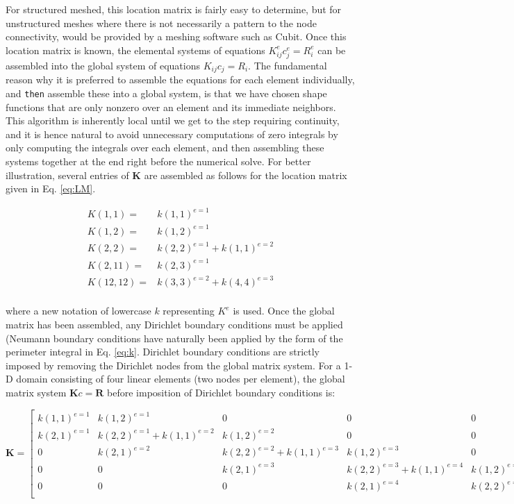 \documentclass[10pt]{article}
\newcommand{\beq}{\begin{equation}}
\newcommand{\eeq}{\end{equation}}
\newcommand{\beqa}{\begin{equation}\begin{aligned}}
\newcommand{\eeqa}{\end{aligned}\end{equation}}
\begin{document}
For structured meshed, this location matrix is fairly easy to determine, but for unstructured meshes where there is not necessarily a pattern to the node connectivity, would be provided by a meshing software such as Cubit. Once this location matrix is known, the elemental systems of equations \(K_{ij}^ec_j^e=R_i^e\) can be assembled into the global system of equations \(K_{ij}c_j=R_i\). The fundamental reason why it is preferred to assemble the equations for each element individually, and {\tt then} assemble these into a global system, is that we have chosen shape functions that are only nonzero over an element and its immediate neighbors. This algorithm is inherently local until we get to the step requiring continuity, and it is hence natural to avoid unnecessary computations of zero integrals by only computing the integrals over each element, and then assembling these systems together at the end right before the numerical solve. For better illustration, several entries of \textbf{K} are assembled as follows for the location matrix given in Eq. \eqref{eq:LM}.

\beqa
K(1, 1) =& k(1, 1)^{e=1}\\
K(1, 2) =& k(1, 2)^{e=1}\\
K(2, 2) =& k(2, 2)^{e=1}+k(1, 1)^{e=2}\\
K(2, 11) =& k(2, 3)^{e=1}\\
K(12, 12) =& k(3, 3)^{e=2}+k(4, 4)^{e=3}\\
\eeqa

where a new notation of lowercase \(k\) representing \(K^e\) is used. Once the global matrix has been assembled, any Dirichlet boundary conditions must be applied (Neumann boundary conditions have naturally been applied by the form of the perimeter integral in Eq. \eqref{eq:k}. Dirichlet boundary conditions are strictly imposed by removing the Dirichlet nodes from the global matrix system. For a 1-D domain consisting of four linear elements (two nodes per element), the global matrix system \(\textbf{K}c=\textbf{R}\) before imposition of Dirichlet boundary conditions is:

\beq
\textbf{K}=
\begin{bmatrix}
k(1, 1)^{e=1} & k(1, 2)^{e=1} & 0 & 0 & 0\\
k(2, 1)^{e=1} & k(2, 2)^{e=1}+k(1, 1)^{e=2} & k(1, 2)^{e=2} & 0 & 0\\
0 & k(2, 1)^{e=2} & k(2, 2)^{e=2}+k(1, 1)^{e=3} & k(1, 2)^{e=3} & 0\\
0 & 0 & k(2, 1)^{e=3} & k(2, 2)^{e=3}+k(1, 1)^{e=4} & k(1, 2)^{e=4}\\
0 & 0 & 0 & k(2, 1)^{e=4} & k(2, 2)^{e=4}\\
\end{bmatrix}
\eeq
\end{document}
